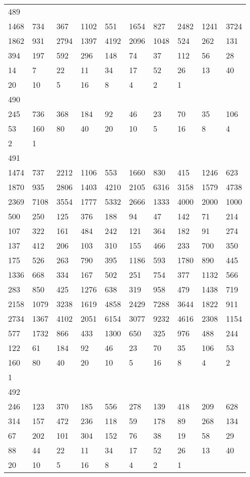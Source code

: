 \begin{longtable}{*{10}{l}}
489&&&&&&&&&\\
1468& 734& 367& 1102& 551& 1654& 827& 2482& 1241& 3724\\
1862& 931& 2794& 1397& 4192& 2096& 1048& 524& 262& 131\\
394& 197& 592& 296& 148& 74& 37& 112& 56& 28\\
14& 7& 22& 11& 34& 17& 52& 26& 13& 40\\
20& 10& 5& 16& 8& 4& 2& 1& \\

490&&&&&&&&&\\
245& 736& 368& 184& 92& 46& 23& 70& 35& 106\\
53& 160& 80& 40& 20& 10& 5& 16& 8& 4\\
2& 1& \\

491&&&&&&&&&\\
1474& 737& 2212& 1106& 553& 1660& 830& 415& 1246& 623\\
1870& 935& 2806& 1403& 4210& 2105& 6316& 3158& 1579& 4738\\
2369& 7108& 3554& 1777& 5332& 2666& 1333& 4000& 2000& 1000\\
500& 250& 125& 376& 188& 94& 47& 142& 71& 214\\
107& 322& 161& 484& 242& 121& 364& 182& 91& 274\\
137& 412& 206& 103& 310& 155& 466& 233& 700& 350\\
175& 526& 263& 790& 395& 1186& 593& 1780& 890& 445\\
1336& 668& 334& 167& 502& 251& 754& 377& 1132& 566\\
283& 850& 425& 1276& 638& 319& 958& 479& 1438& 719\\
2158& 1079& 3238& 1619& 4858& 2429& 7288& 3644& 1822& 911\\
2734& 1367& 4102& 2051& 6154& 3077& 9232& 4616& 2308& 1154\\
577& 1732& 866& 433& 1300& 650& 325& 976& 488& 244\\
122& 61& 184& 92& 46& 23& 70& 35& 106& 53\\
160& 80& 40& 20& 10& 5& 16& 8& 4& 2\\
1& \\

492&&&&&&&&&\\
246& 123& 370& 185& 556& 278& 139& 418& 209& 628\\
314& 157& 472& 236& 118& 59& 178& 89& 268& 134\\
67& 202& 101& 304& 152& 76& 38& 19& 58& 29\\
88& 44& 22& 11& 34& 17& 52& 26& 13& 40\\
20& 10& 5& 16& 8& 4& 2& 1& \\


\end{longtable}
